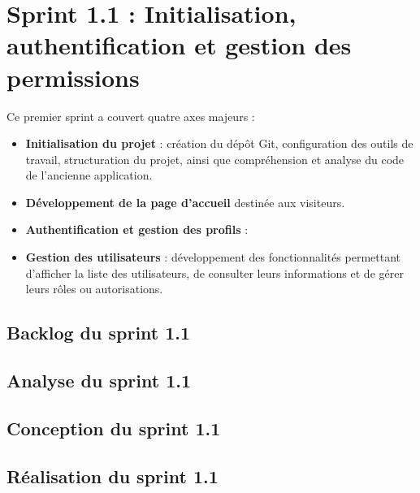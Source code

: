 \section{Sprint 1.1 : Initialisation, authentification et gestion des permissions}
Ce premier sprint a couvert quatre axes majeurs :
\begin{itemize}[label=$-$]
    \item \textbf{Initialisation du projet} : création du dépôt Git, configuration des outils de travail, structuration du projet, ainsi que compréhension et analyse du code de l’ancienne application.
    \item \textbf{Développement de la page d’accueil} destinée aux visiteurs.
    \item \textbf{Authentification et gestion des profils} :
    \item \textbf{Gestion des utilisateurs} : développement des fonctionnalités permettant d’afficher la liste des utilisateurs, de consulter leurs informations et de gérer leurs rôles ou autorisations.
\end{itemize}
\subsection{Backlog du sprint 1.1}  


\subsection{Analyse du sprint 1.1}


\subsection{Conception du sprint 1.1}


\subsection{Réalisation du sprint 1.1}

